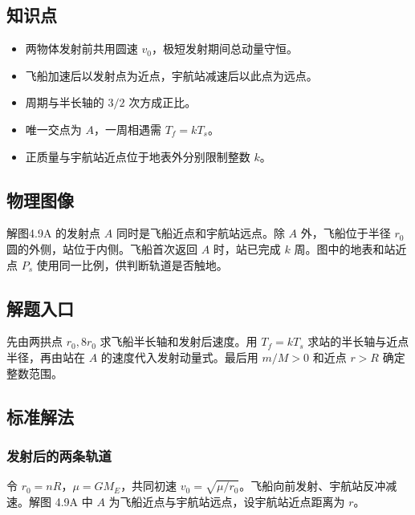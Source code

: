 \documentclass[UTF8,fontset=fandol,a4paper,11pt]{ctexart}
\begin{document}


\subsection*{知识点}

\begin{itemize}
\item 两物体发射前共用圆速 $v_0$，极短发射期间总动量守恒。
\item 飞船加速后以发射点为近点，宇航站减速后以此点为远点。
\item 周期与半长轴的 $3/2$ 次方成正比。
\item 唯一交点为 $A$，一周相遇需 $T_f=kT_s$。
\item 正质量与宇航站近点位于地表外分别限制整数 $k$。
\end{itemize}




\subsection*{物理图像}

解图4.9A 的发射点 $A$ 同时是飞船近点和宇航站远点。除 $A$ 外，飞船位于半径 $r_0$ 圆的外侧，站位于内侧。飞船首次返回 $A$ 时，站已完成 $k$ 周。图中的地表和站近点 $P_s$ 使用同一比例，供判断轨道是否触地。



\subsection*{解题入口}

先由两拱点 $r_0,8r_0$ 求飞船半长轴和发射后速度。用 $T_f=kT_s$ 求站的半长轴与近点半径，再由站在 $A$ 的速度代入发射动量式。最后用 $m/M>0$ 和近点 $r>R$ 确定整数范围。



\subsection*{标准解法}

\subsubsection*{发射后的两条轨道}
令 $r_0=nR$，$\mu=GM_E$，共同初速 $v_0=\sqrt{\mu/r_0}$。飞船向前发射、宇航站反冲减速。解图 4.9A 中 $A$ 为飞船近点与宇航站远点，设宇航站近点距离为 $r$。
\end{document}

